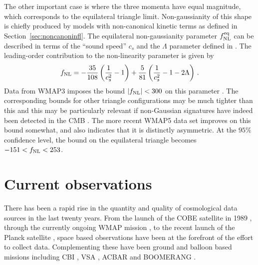 The other important case is   
where the three momenta have equal magnitude, which corresponds to the
equilateral triangle limit. Non-gaussianity of this shape is chiefly produced
by models with non-canonical kinetic terms as defined in
Section~\ref{sec:noncanoninfl}. The equilateral non-gaussianity parameter
$f_{\mathrm{NL}}^{\mathrm{eq}}$ can be described in terms of the ``sound speed'' $c_s$ and the
$\Lambda$ parameter defined in .
The leading-order contribution to the
non-linearity 
parameter is given by \cite{chenetal,lidser3}
% 
\begin{equation} 
\label{eq:fnldefn-dbiintro}
 f_{\mathrm{NL}} = -\frac{35}{108}\left(\frac{1}{c_s^2} -1 \right) +
\frac{5}{81}\left( \frac{1}{c_s^2} -1 -2\Lambda \right) \,.
\end{equation}
%  
Data from WMAP3 imposes the bound $|f_{\mathrm{NL}}| < 300$ on this parameter
\cite{spergel}. The corresponding bounds for other triangle configurations 
may be much tighter than this and this may be particularly relevant if 
non-Gaussian signatures have indeed been detected in the 
CMB \cite{Yadav:2007yy,crim}. The more recent WMAP5 data set
\cite{Komatsu:2008hk} improves on this bound somewhat, and
also indicates that it is distinctly asymmetric. At the $95 \%$ confidence
level, the bound on the 
equilateral triangle becomes $-151 < f_{\mathrm{NL}} < 253$.





\section{Current observations}
\label{sec:obs-intro}
There has been a rapid rise in the quantity and quality of cosmological data
sources in the last twenty years. From the launch of the COBE satellite in
1989 \cite{Bennett1994, Bennett1996c}, through the currently
ongoing WMAP mission \cite{spergel, Komatsu:2008hk}, to the recent launch of the
Planck satellite \cite{planck}, space based observations have been at the
forefront of the effort to collect data. Complementing these have been ground
and balloon based missions including CBI
\cite{Mason2003b, Sievers2003, Sievers2007}, VSA \cite{Dickinson2004}, ACBAR
\cite{Kuo2004, Kuo2007} and BOOMERANG \cite{Ruhl2003, Montroy2006,
Piacentini2006}.

